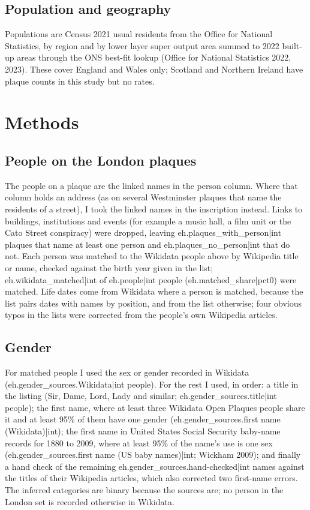\documentclass[11pt,a4paper]{article}
\begin{document}
\subsection{Population and geography}

Populations are Census 2021 usual residents from the Office for National Statistics, by region and by lower layer super output area summed to 2022 built-up areas through the ONS best-fit lookup (Office for National Statistics 2022, 2023). These cover England and Wales only; Scotland and Northern Ireland have plaque counts in this study but no rates.

\section{Methods}

\subsection{People on the London plaques}

The people on a plaque are the linked names in the person column. Where that column holds an address (as on several Westminster plaques that name the residents of a street), I took the linked names in the inscription instead. Links to buildings, institutions and events (for example a music hall, a film unit or the Cato Street conspiracy) were dropped, leaving {{eh.plaques_with_person|int}} plaques that name at least one person and {{eh.plaques_no_person|int}} that do not. Each person was matched to the Wikidata people above by Wikipedia title or name, checked against the birth year given in the list; {{eh.wikidata_matched|int}} of {{eh.people|int}} people ({{eh.matched_share|pct0}}) were matched. Life dates come from Wikidata where a person is matched, because the list pairs dates with names by position, and from the list otherwise; four obvious typos in the lists were corrected from the people's own Wikipedia articles.

\subsection{Gender}

For matched people I used the sex or gender recorded in Wikidata ({{eh.gender_sources.Wikidata|int}} people). For the rest I used, in order: a title in the listing (Sir, Dame, Lord, Lady and similar; {{eh.gender_sources.title|int}} people); the first name, where at least three Wikidata Open Plaques people share it and at least 95\% of them have one gender ({{eh.gender_sources.first name (Wikidata)|int}}); the first name in United States Social Security baby-name records for 1880 to 2009, where at least 95\% of the name's use is one sex ({{eh.gender_sources.first name (US baby names)|int}}; Wickham 2009); and finally a hand check of the remaining {{eh.gender_sources.hand-checked|int}} names against the titles of their Wikipedia articles, which also corrected two first-name errors. The inferred categories are binary because the sources are; no person in the London set is recorded otherwise in Wikidata.
\end{document}
